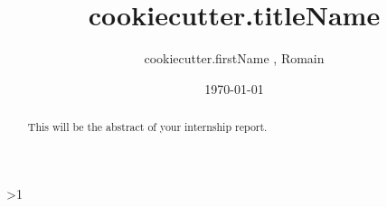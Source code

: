 \documentclass[a4paper]{article}  %
\title{ {{cookiecutter.titleName}} }
\author{ {{cookiecutter.firstName}} \famName{ {{cookiecutter.familyName}} }, Romain \famName{Noël} }
\date{\today}
\newcommand{\Pathbasebib}{\PathR/ref_RN.bib,\PathR/ref_XX.bib}%
\begin{document}

\maketitle

	\begin{abstract}
		This will be the abstract of your internship report.
	\end{abstract}







\ifnum\value{levelstanda}>1
	{}%
\else

	\printunsrtglossary[type=acronym]
	\printunsrtglossary[type=symbol]
\fi

\addtocounter{levelstanda}{-1}
\end{document}
